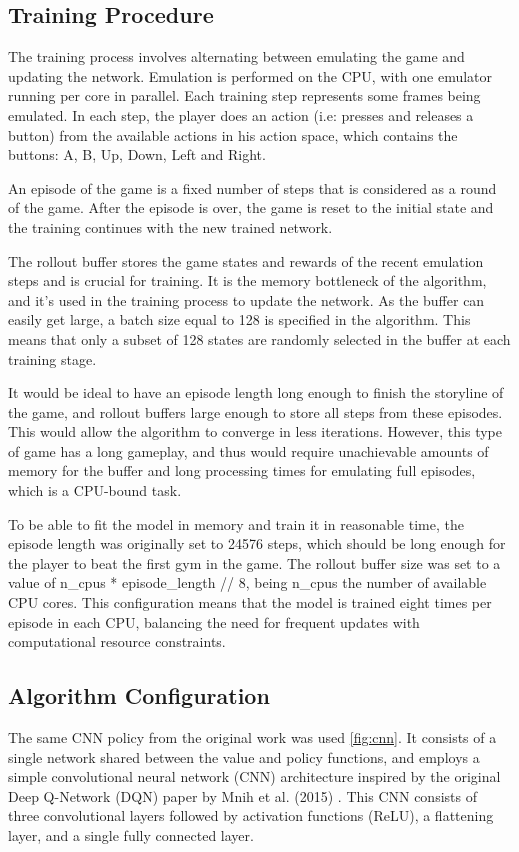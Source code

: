 \documentclass[10pt,conference]{IEEEtran}
\begin{document}
\subsection{Training Procedure}

The training process involves alternating between emulating the game and updating the network. Emulation is performed on the CPU, with one emulator running per core in parallel. Each training step represents some frames being emulated. In each step, the player does an action (i.e: presses and releases a button) from the available actions in his action space, which contains the buttons: A, B, Up, Down, Left and Right. 

An episode of the game is a fixed number of steps that is considered as a round of the game. After the episode is over, the game is reset to the initial state and the training continues with the new trained network. 

The rollout buffer stores the game states and rewards of the recent emulation steps and is crucial for training. It is the memory bottleneck of the algorithm, and it's used in the training process to update the network. As the buffer can  easily get large, a batch size equal to 128 is specified in the algorithm. This means that only a subset of 128 states are randomly selected in the buffer at each training stage.

It would be ideal to have an episode length long enough to finish the storyline of the game, and rollout buffers large enough to store all steps from these episodes. This would allow the algorithm to converge in less iterations. However, this type of game has a long gameplay, and thus would require unachievable amounts of memory for the buffer and long processing times for emulating full episodes, which is a CPU-bound task.

To be able to fit the model in memory and train it in reasonable time, the episode length was originally set to 24576 steps, which should be long enough for the player to beat the first gym in the game. The rollout buffer size was set to a value of n\_cpus * episode\_length // 8, being n\_cpus the number of available CPU cores. This configuration means that the model is trained eight times per episode in each CPU, balancing the need for frequent updates with computational resource constraints.





\subsection{Algorithm Configuration}
The same CNN policy from the original work was used \ref{fig:cnn}. It consists of a single network shared between the value and policy functions, and employs a simple convolutional neural network (CNN) architecture inspired by the original Deep Q-Network (DQN) paper by Mnih et al. (2015) \cite{ref:dqn}. This CNN consists of three convolutional layers followed by activation functions (ReLU), a flattening layer, and a single fully connected layer. 
\end{document}
